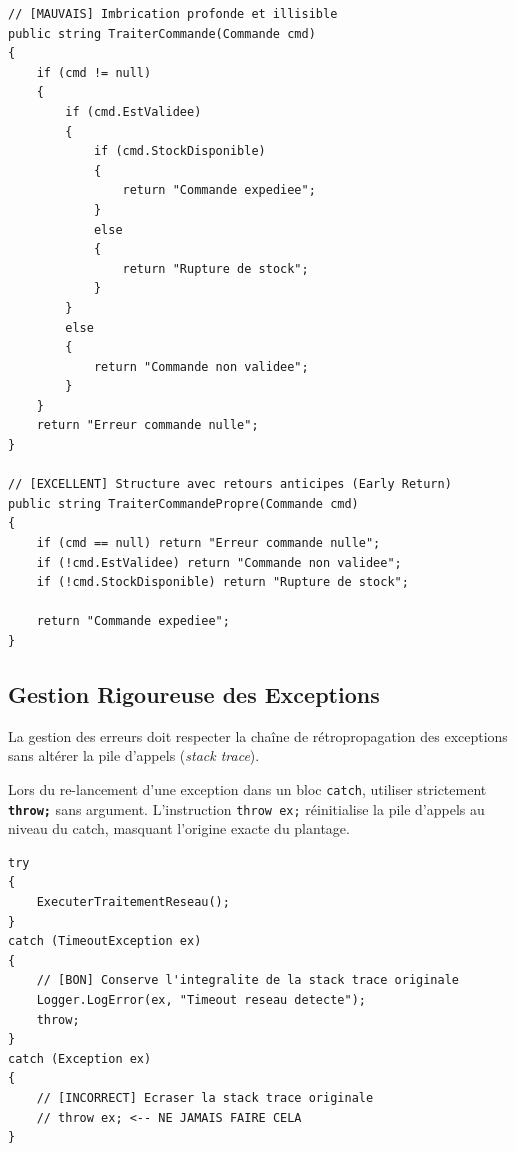 \begin{lstlisting}[caption={Réfractorisation d'une méthode complexe par Early Return}]
// [MAUVAIS] Imbrication profonde et illisible
public string TraiterCommande(Commande cmd)
{
    if (cmd != null)
    {
        if (cmd.EstValidee)
        {
            if (cmd.StockDisponible)
            {
                return "Commande expediee";
            }
            else
            {
                return "Rupture de stock";
            }
        }
        else
        {
            return "Commande non validee";
        }
    }
    return "Erreur commande nulle";
}

// [EXCELLENT] Structure avec retours anticipes (Early Return)
public string TraiterCommandePropre(Commande cmd)
{
    if (cmd == null) return "Erreur commande nulle";
    if (!cmd.EstValidee) return "Commande non validee";
    if (!cmd.StockDisponible) return "Rupture de stock";

    return "Commande expediee";
}
\end{lstlisting}



\subsection{Gestion Rigoureuse des Exceptions}

La gestion des erreurs doit respecter la chaîne de rétropropagation des exceptions sans altérer la pile d'appels (\emph{stack trace}).

\begin{tcolorbox}[colback=backcolour,colframe=codegray,title=\textbf{Règle d'or : \texttt{throw;} vs \texttt{throw ex;}}]
    Lors du re-lancement d'une exception dans un bloc \texttt{catch}, utiliser strictement \textbf{\texttt{throw;}} sans argument. L'instruction \texttt{throw ex;} réinitialise la pile d'appels au niveau du catch, masquant l'origine exacte du plantage.
\end{tcolorbox}

\begin{lstlisting}[caption={Bonnes pratiques de re-lancement d'exceptions}]
try
{
    ExecuterTraitementReseau();
}
catch (TimeoutException ex)
{
    // [BON] Conserve l'integralite de la stack trace originale
    Logger.LogError(ex, "Timeout reseau detecte");
    throw; 
}
catch (Exception ex)
{
    // [INCORRECT] Ecraser la stack trace originale
    // throw ex; <-- NE JAMAIS FAIRE CELA
}
\end{lstlisting}



